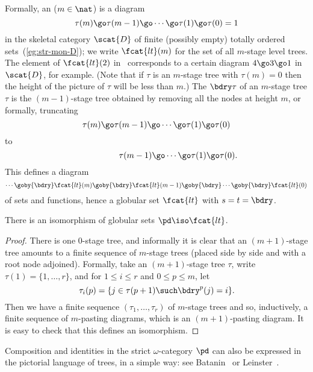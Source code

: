 Formally, an  ($m\in\nat$) is a
diagram
\[
\tau(m)\go\tau(m-1)\go\cdots\go\tau(1)\go\tau(0)=1
\]
in the skeletal category $\scat{D}$ of finite (possibly empty) totally
ordered sets~(\ref{eg:str-mon-D}); we write $\fcat{lt}(m)$ for the set of
all $m$-stage level trees.  The element of $\fcat{lt}(2)$
in~ corresponds to a certain diagram $4\go 3\go 1$
in $\scat{D}$, for example.  (Note that if $\tau$ is an $m$-stage tree with
$\tau(m)=0$ then the height of the picture of $\tau$ will be less than
$m$.)  The %
%
%
$\bdry\tau$ of an $m$-stage tree $\tau$ is the
$(m-1)$-stage tree obtained by removing all the nodes at height $m$, or
formally, truncating
\[
\tau(m)\go\tau(m-1)\go\cdots\go\tau(1)\go\tau(0)
\]
to
\[
\mbox{\hspace{5.2em}}
\tau(m-1)\go\cdots\go\tau(1)\go\tau(0).
\]
This defines a diagram
%
\begin{equation}	%
\cdots 
\goby{\bdry} 
\fcat{lt}(m) 
\goby{\bdry} 
\fcat{lt}(m-1) 
\goby{\bdry}
\cdots 
\goby{\bdry} 
\fcat{lt}(0)
\end{equation}
%
of sets and functions, hence a globular set $\fcat{lt}$ with $s = t =
\bdry$.    

\begin{propn}
There is an isomorphism of globular sets $\pd \iso \fcat{lt}$.
\end{propn}
%
\begin{proof}
There is one 0-stage tree, and informally it is clear that an $(m+1)$-stage
tree amounts to a finite sequence of $m$-stage trees (placed side by side
and with a root node adjoined).  Formally, take an $(m+1)$-stage tree
$\tau$, write $\tau(1) = \{1, \ldots, r\}$, and for $1\leq i \leq r$ and $0
\leq p \leq m$, let
\[
\tau_i(p)
=
\{ j \in \tau(p+1)
\such
\bdry^p (j) = i \}.
\]
Then we have a finite sequence $(\tau_1, \ldots, \tau_r)$ of $m$-stage
trees and so, inductively, a finite sequence of $m$-pasting diagrams, which
is an $(m+1)$-pasting diagram.  It is easy to check that this defines an
isomorphism.  
\done
\end{proof}

Composition and identities in the strict $\omega$-category $\pd$ can also
be expressed in the pictorial language of trees, in a simple way: see
Batanin~\cite{BatMGC} or Leinster~\cite[Ch.~II]{SHDCT}.

\paragraph*{}

